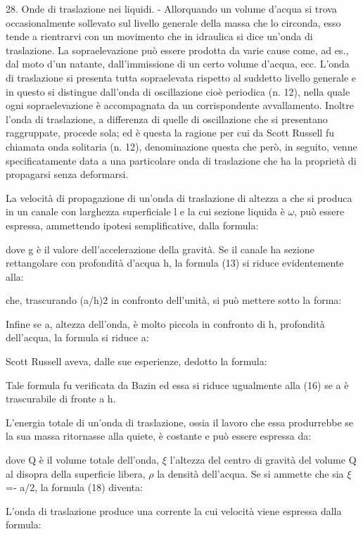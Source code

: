 \documentclass[a4paper]{article}
\begin{document}
28. Onde di traslazione nei liquidi. - Allorquando un volume d'acqua si trova occasionalmente sollevato sul livello generale della massa che lo circonda, esso tende a rientrarvi con un movimento che in idraulica si dice un'onda di traslazione. La sopraelevazione può essere prodotta da varie cause come, ad es., dal moto d'un natante, dall'immissione di un certo volume d'acqua, ecc. L'onda di traslazione si presenta tutta sopraelevata rispetto al suddetto livello generale e in questo si distingue dall'onda di oscillazione cioè periodica (n. 12), nella quale ogni sopraelevazione è accompagnata da un corrispondente avvallamento. Inoltre l'onda di traslazione, a differenza di quelle di oscillazione che si presentano raggruppate, procede sola; ed è questa la ragione per cui da Scott Russell fu chiamata onda solitaria (n. 12), denominazione questa che però, in seguito, venne specificatamente data a una particolare onda di traslazione che ha la proprietà di propagarsi senza deformarsi.

La velocità di propagazione di un'onda di traslazione di altezza a che si produca in un canale con larghezza superficiale l e la cui sezione liquida è $\omega$, può essere espressa, ammettendo ipotesi semplificative, dalla formula:

dove g è il valore dell'accelerazione della gravità. Se il canale ha sezione rettangolare con profondità d'acqua h, la formula (13) si riduce evidentemente alla:

che, trascurando (a/h)2 in confronto dell'unità, si può mettere sotto la forma:

Infine se a, altezza dell'onda, è molto piccola in confronto di h, profondità dell'acqua, la formula si riduce a:

Scott Russell aveva, dalle sue esperienze, dedotto la formula:

Tale formula fu verificata da Bazin ed essa si riduce ugualmente alla (16) se a è trascurabile di fronte a h.

L'energia totale di un'onda di traslazione, ossia il lavoro che essa produrrebbe se la sua massa ritornasse alla quiete, è costante e può essere espressa da:

dove Q è il volume totale dell'onda, $\xi$ l'altezza del centro di gravità del volume Q al disopra della superficie libera, $\rho$ la densità dell'acqua. Se si ammette che sia $\xi$ =- a/2, la formula (18) diventa:

L'onda di traslazione produce una corrente la cui velocità viene espressa dalla formula:
\end{document}
